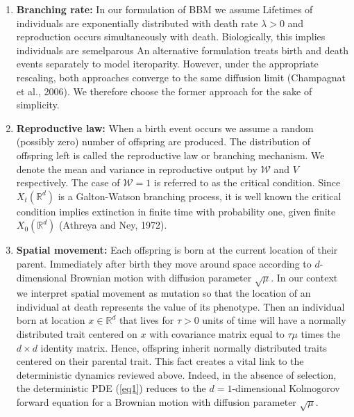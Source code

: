 \documentclass[]{elsarticle} %
\begin{document}
\begin{enumerate}
\def\labelenumi{\arabic{enumi})}
\item
  \textbf{Branching rate:} In our formulation of BBM we assume Lifetimes
  of individuals are exponentially distributed with death rate
  \(\lambda>0\) and reproduction occurs simultaneously with death.
  Biologically, this implies individuals are semelparous An alternative
  formulation treats birth and death events separately to model
  iteroparity. However, under the appropriate rescaling, both approaches
  converge to the same diffusion limit (Champagnat et al., 2006). We
  therefore choose the former approach for the sake of simplicity.
\item
  \textbf{Reproductive law:} When a birth event occurs we assume a
  random (possibly zero) number of offspring are produced. The
  distribution of offspring left is called the reproductive law or
  branching mechanism. We denote the mean and variance in reproductive
  output by \(\mathscr{W}\) and \(V\) respectively. The case of
  \(\mathscr{W}=1\) is referred to as the critical condition. Since
  \(X_t(\mathbb{R}^d)\) is a Galton-Watson branching process, it is well
  known the critical condition implies extinction in finite time with
  probability one, given finite \(X_0(\mathbb{R}^d)\) (Athreya and Ney,
  1972).
\item
  \textbf{Spatial movement:} Each offspring is born at the current
  location of their parent. Immediately after birth they move around
  space according to \(d\)-dimensional Brownian motion with diffusion
  parameter \(\sqrt\mu\). In our context we interpret spatial movement
  as mutation so that the location of an individual at death represents
  the value of its phenotype. Then an individual born at location
  \(x\in\mathbb{R}^d\) that lives for \(\tau>0\) units of time will have
  a normally distributed trait centered on \(x\) with covariance matrix
  equal to \(\tau\mu\) times the \(d\times d\) identity matrix. Hence,
  offspring inherit normally distributed traits centered on their
  parental trait. This fact creates a vital link to the deterministic
  dynamics reviewed above. Indeed, in the absence of selection, the
  deterministic PDE (\ref{eq1}) reduces to the \(d=1\)-dimensional
  Kolmogorov forward equation for a Brownian motion with diffusion
  parameter \(\sqrt\mu\).
\end{enumerate}
\end{document}
